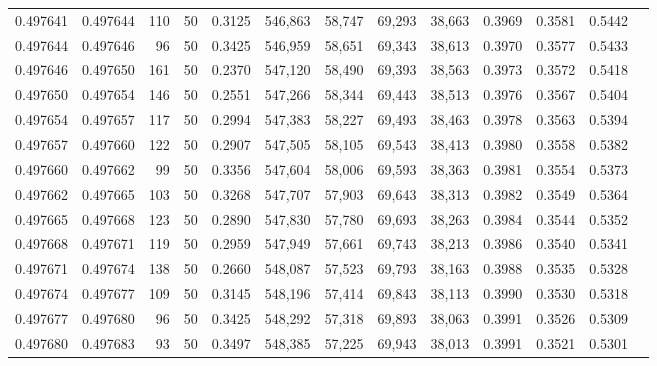 \begin{tabular}{rrrrrrrrrrrrr}
0.497641 & 0.497644 &   110 &  50 &                                     0.3125 & 546,863 &  58,747 &  69,293 &  38,663 & 0.3969 & 0.3581 & 0.5442 \\
0.497644 & 0.497646 &    96 &  50 &                                     0.3425 & 546,959 &  58,651 &  69,343 &  38,613 & 0.3970 & 0.3577 & 0.5433 \\
0.497646 & 0.497650 &   161 &  50 &                                     0.2370 & 547,120 &  58,490 &  69,393 &  38,563 & 0.3973 & 0.3572 & 0.5418 \\
0.497650 & 0.497654 &   146 &  50 &                                     0.2551 & 547,266 &  58,344 &  69,443 &  38,513 & 0.3976 & 0.3567 & 0.5404 \\
0.497654 & 0.497657 &   117 &  50 &                                     0.2994 & 547,383 &  58,227 &  69,493 &  38,463 & 0.3978 & 0.3563 & 0.5394 \\
0.497657 & 0.497660 &   122 &  50 &                                     0.2907 & 547,505 &  58,105 &  69,543 &  38,413 & 0.3980 & 0.3558 & 0.5382 \\
0.497660 & 0.497662 &    99 &  50 &                                     0.3356 & 547,604 &  58,006 &  69,593 &  38,363 & 0.3981 & 0.3554 & 0.5373 \\
0.497662 & 0.497665 &   103 &  50 &                                     0.3268 & 547,707 &  57,903 &  69,643 &  38,313 & 0.3982 & 0.3549 & 0.5364 \\
0.497665 & 0.497668 &   123 &  50 &                                     0.2890 & 547,830 &  57,780 &  69,693 &  38,263 & 0.3984 & 0.3544 & 0.5352 \\
0.497668 & 0.497671 &   119 &  50 &                                     0.2959 & 547,949 &  57,661 &  69,743 &  38,213 & 0.3986 & 0.3540 & 0.5341 \\
0.497671 & 0.497674 &   138 &  50 &                                     0.2660 & 548,087 &  57,523 &  69,793 &  38,163 & 0.3988 & 0.3535 & 0.5328 \\
0.497674 & 0.497677 &   109 &  50 &                                     0.3145 & 548,196 &  57,414 &  69,843 &  38,113 & 0.3990 & 0.3530 & 0.5318 \\
0.497677 & 0.497680 &    96 &  50 &                                     0.3425 & 548,292 &  57,318 &  69,893 &  38,063 & 0.3991 & 0.3526 & 0.5309 \\
0.497680 & 0.497683 &    93 &  50 &                                     0.3497 & 548,385 &  57,225 &  69,943 &  38,013 & 0.3991 & 0.3521 & 0.5301 \\

\end{tabular}
